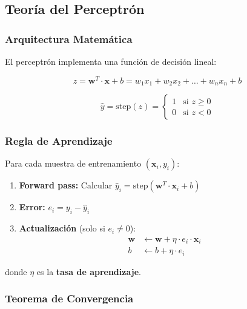 \documentclass[12pt]{src/formato_utem}
\begin{document}
\subsection{Teoría del Perceptrón}

\subsubsection{Arquitectura Matemática}

El perceptrón implementa una función de decisión lineal:

\begin{equation}
z = \mathbf{w}^T \cdot \mathbf{x} + b = w_1 x_1 + w_2 x_2 + \ldots + w_n x_n + b
\end{equation}

\begin{equation}
\hat{y} = \text{step}(z) = 
\begin{cases}
1 & \text{si } z \geq 0 \\
0 & \text{si } z < 0
\end{cases}
\end{equation}

\subsubsection{Regla de Aprendizaje}

Para cada muestra de entrenamiento $(\mathbf{x}_i, y_i)$:

\begin{enumerate}
    \item \textbf{Forward pass:} Calcular $\hat{y}_i = \text{step}(\mathbf{w}^T \cdot \mathbf{x}_i + b)$
    \item \textbf{Error:} $e_i = y_i - \hat{y}_i$
    \item \textbf{Actualización} (solo si $e_i \neq 0$):
    \begin{align}
        \mathbf{w} &\leftarrow \mathbf{w} + \eta \cdot e_i \cdot \mathbf{x}_i \\
        b &\leftarrow b + \eta \cdot e_i
    \end{align}
\end{enumerate}

donde $\eta$ es la \textbf{tasa de aprendizaje}.

\subsubsection{Teorema de Convergencia}
\end{document}
